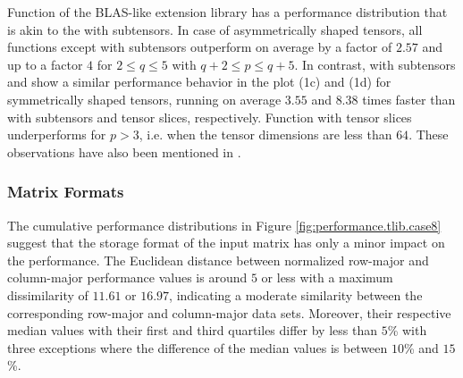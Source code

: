 Function  of the BLAS-like extension library has a performance distribution that is akin to the  with subtensors.
In case of asymmetrically shaped tensors, all functions except  with subtensors outperform  on average by a factor of $2.57$ and up to a factor $4$ for $2 \leq q\leq5$ with $q+2 \leq p \leq q+5$. %
In contrast,  with subtensors and  show a similar performance behavior in the plot (1c) and (1d) for symmetrically shaped tensors, running on average $3.55$ and $8.38$ times faster than  with subtensors and tensor slices, respectively.
Function  with tensor slices underperforms for $p>3$, i.e. when the tensor dimensions are less than $64$.
These observations have also been mentioned in \cite{bassoy:2024:ttm}.



\subsubsection{Matrix Formats}
The cumulative performance distributions in Figure \ref{fig:performance.tlib.case8} suggest that the storage format of the input matrix has only a minor impact on the performance.
The Euclidean distance between normalized row-major and column-major performance values is around $5$ or less with a maximum dissimilarity of $11.61$ or $16.97$, indicating a moderate similarity between the corresponding row-major and column-major data sets.
Moreover, their respective median values with their first and third quartiles differ by less than $5$\% with three exceptions where the difference of the median values is between $10$\% and $15$\%.



